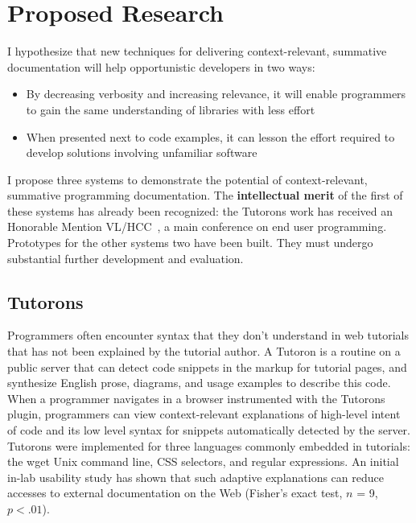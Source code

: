 \documentclass[12pt]{memoir}
\begin{document}
\section{Proposed Research}

I hypothesize that new techniques for delivering context-relevant, summative documentation will help opportunistic developers in two ways:
\begin{itemize}[noitemsep,topsep=0pt]
\item By decreasing verbosity and increasing relevance, it will enable programmers to gain the same understanding of libraries with less effort
\item When presented next to code examples, it can lesson the effort required to develop solutions involving unfamiliar software
\end{itemize}

I propose three systems to demonstrate the potential of context-relevant, summative programming documentation.
The \textbf{intellectual merit} of the first of these systems has already been recognized:
the Tutorons work has received an Honorable Mention VL/HCC~\cite{head_tutorons_2015}, a main conference on end user programming.
Prototypes for the other systems two have been built.
They must undergo substantial further development and evaluation.

\subsection{Tutorons}
Programmers often encounter syntax that they don't understand in web tutorials that has not been explained by the tutorial author.
A Tutoron is a routine on a public server that can detect code snippets in the markup for tutorial pages, and synthesize English prose, diagrams, and usage examples to describe this code.
When a programmer navigates in a browser instrumented with the Tutorons plugin, programmers can view context-relevant explanations of high-level intent of code and its low level syntax for snippets automatically detected by the server.
Tutorons were implemented for three languages commonly embedded in tutorials: the wget Unix command line, CSS selectors, and regular expressions.
An initial in-lab usability study has shown that such adaptive explanations can reduce accesses to external documentation on the Web (Fisher's exact test, $n$ = 9, $p<.01$).
\end{document}
